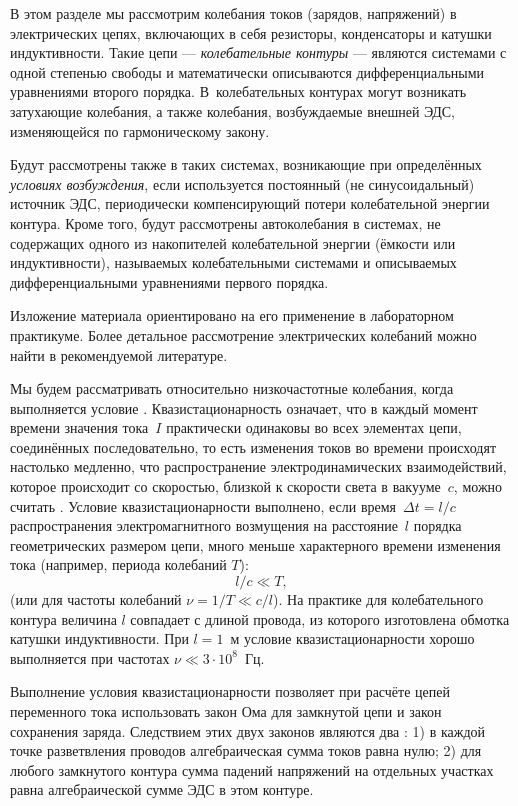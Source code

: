 В этом разделе мы рассмотрим колебания токов (зарядов, напряжений) 
в электрических цепях, включающих в себя резисторы, конденсаторы и катушки 
индуктивности. Такие цепи --- \emph{колебательные контуры} --- являются системами 
с одной степенью свободы и математически описываются дифференциальными 
уравнениями второго порядка. В~колебательных контурах могут возникать 
 затухающие колебания, а также  
колебания, возбуждаемые внешней ЭДС, изменяющейся по гармоническому закону.

Будут рассмотрены также  в таких системах, 
возникающие при определённых \emph{условиях возбуждения}, если используется 
постоянный (не синусоидальный) источник ЭДС, периодически компенсирующий 
потери колебательной энергии контура.
Кроме того, будут рассмотрены автоколебания в системах, не содержащих 
одного из накопителей колебательной энергии (ёмкости или индуктивности), 
называемых  колебательными системами и описываемых 
дифференциальными уравнениями первого порядка.

Изложение материала ориентировано на его применение в лабораторном практикуме. 
Более детальное рассмотрение электрических колебаний можно найти
в рекомендуемой литературе.

Мы будем рассматривать относительно низкочастотные колебания, когда
выполняется условие . Квазистационарность означает, что в
каждый момент времени значения тока~$I$ практически одинаковы во всех элементах
цепи, соединённых последовательно, то есть изменения токов во времени происходят
настолько медленно, что распространение электродинамических взаимодействий,
которое происходит со скоростью, близкой к скорости света в вакууме~$c$, можно
считать . Условие квазистационарности выполнено, если
время~$\Delta t=l/c$ распространения электромагнитного возмущения на расстояние~$l$
порядка геометрических размером цепи, 
много меньше характерного времени изменения тока 
(например, периода колебаний $T$):
\begin{equation*}
l/c\ll T,
\end{equation*}
(или для частоты колебаний $\nu=1/T\ll c/l$). 
На практике для колебательного контура величина $l$ совпадает с длиной провода, 
из которого изготовлена обмотка катушки индуктивности. 
При $l=1$~м условие квазистационарности хорошо
выполняется при частотах $\nu\ll3\cdot10^8$~Гц.

Выполнение условия квазистационарности позволяет при расчёте цепей переменного
тока использовать закон Ома для замкнутой цепи и закон сохранения заряда. 
Следствием этих двух законов являются два :
1) в каждой точке разветвления проводов
алгебраическая сумма токов равна нулю; 2)
для любого замкнутого
контура сумма падений напряжений на отдельных участках равна алгебраической
сумме ЭДС в этом контуре.


